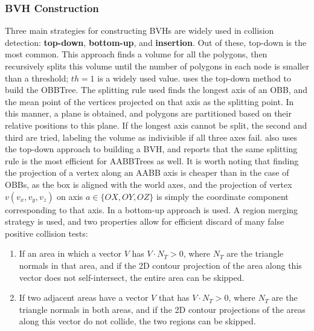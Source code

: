 \subsubsection{BVH Construction}
\label{sub-sub-sec:bvhconstruction}

Three main strategies for constructing BVHs are widely used in collision detection: \textbf{top-down}, \textbf{bottom-up}, and \textbf{insertion}. Out of these, top-down is the most common. This approach finds a volume for all the polygons, then recursively splits this volume until the number of polygons in each node is smaller than a threshold; $th = 1$ is a widely used value. \cite{gott96} uses the top-down method to build the OBBTree. The splitting rule used finds the longest axis of an OBB, and the mean point of the vertices projected on that axis as the splitting point. In this manner, a plane is obtained, and polygons are partitioned based on their relative positions to this plane. If the longest axis cannot be split, the second and third are tried, labeling the volume as indivisible if all three axes fail. \citep{vdb97} also uses the top-down approach to building a BVH, and reports that the same splitting rule is the most efficient for AABBTrees as well. It is worth noting that finding the projection of a vertex along an AABB axis is cheaper than in the case of OBBs, as the box is aligned with the world axes, and the projection of vertex $v(v_{x}, v_{y}, v_{z})$ on axis $a \in \{OX, OY, OZ\}$ is simply the coordinate component corresponding to that axis. In \citep{vmt95} a bottom-up approach is used. A region merging strategy is used, and two properties allow for efficient discard of many false positive collision tests:

\begin{enumerate}
	\item \label{prop:sc1} If an area in which a vector $V$ has $V \cdot N_{T} > 0$, where $N_{T}$ are the triangle normals in that area, and if the 2D contour projection of the area along this vector does not self-intersect, the entire area can be skipped.

	\item \label{prop:sc2} If two adjacent areas have a vector $V$ that has $V \cdot N_{T} > 0$, where $N_{T}$ are the triangle normals in both areas, and if the 2D contour projections of the areas along this vector do not collide, the two regions can be skipped.
\end{enumerate}

